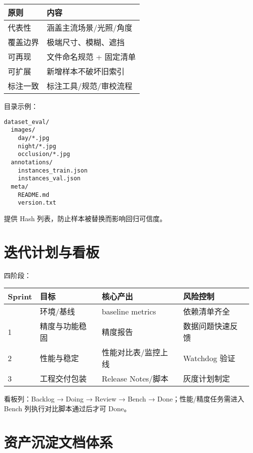 \begin{longtable}[]{@{}ll@{}}
\toprule\noalign{}
原则 & 内容 \\
\midrule\noalign{}
\endhead
\bottomrule\noalign{}
\endlastfoot
代表性 & 涵盖主流场景/光照/角度 \\
覆盖边界 & 极端尺寸、模糊、遮挡 \\
可再现 & 文件命名规范 + 固定清单 \\
可扩展 & 新增样本不破坏旧索引 \\
标注一致 & 标注工具/规范/审校流程 \\
\end{longtable}

目录示例：

\begin{lstlisting}
dataset_eval/
  images/
    day/*.jpg
    night/*.jpg
    occlusion/*.jpg
  annotations/
    instances_train.json
    instances_val.json
  meta/
    README.md
    version.txt
\end{lstlisting}

提供 Hash 列表，防止样本被替换而影响回归可信度。

\section{迭代计划与看板}\label{ux8fedux4ee3ux8ba1ux5212ux4e0eux770bux677f}

四阶段：

\begin{longtable}[]{@{}llll@{}}
\toprule\noalign{}
Sprint & 目标 & 核心产出 & 风险控制 \\
\midrule\noalign{}
\endhead
\bottomrule\noalign{}
\endlastfoot
0 & 环境/基线 & baseline metrics & 依赖清单齐全 \\
1 & 精度与功能稳固 & 精度报告 & 数据问题快速反馈 \\
2 & 性能与稳定 & 性能对比表/监控上线 & Watchdog 验证 \\
3 & 工程交付包装 & Release Notes/脚本 & 灰度计划制定 \\
\end{longtable}

看板列：Backlog → Doing → Review → Bench → Done；性能/精度任务需进入
Bench 列执行对比脚本通过后才可 Done。

\section{资产沉淀文档体系}\label{ux8d44ux4ea7ux6c89ux6dc0ux6587ux6863ux4f53ux7cfb}

